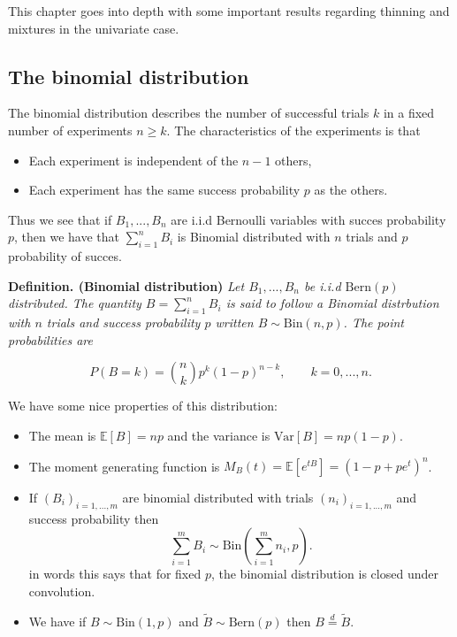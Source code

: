\documentclass[a4paper,10pt,openany]{book}
\providecommand{\tightlist}{%
 \setlength{\itemsep}{0pt}\setlength{\parskip}{0pt}}
\begin{document}
This chapter goes into depth with some important results regarding thinning and mixtures in the univariate case.

\hypertarget{the-binomial-distribution}{%
\subsection{The binomial distribution}\label{the-binomial-distribution}}

The binomial distribution describes the number of successful trials \(k\) in a fixed number of experiments \(n\ge k\). The characteristics of the experiments is that

\begin{itemize}
\tightlist
\item
  Each experiment is independent of the \(n-1\) others,
\item
  Each experiment has the same success probability \(p\) as the others.
\end{itemize}

Thus we see that if \(B_1,...,B_n\) are i.i.d Bernoulli variables with succes probability \(p\), then we have that \(\sum_{i=1}^n B_i\) is Binomial distributed with \(n\) trials and \(p\) probability of succes.

\textbf{Definition. (Binomial distribution)} \emph{Let \(B_1,...,B_n\) be i.i.d \(\text{Bern}(p)\) distributed. The quantity \(B=\sum_{i=1}^n B_i\) is said to follow a Binomial distrbution with \(n\) trials and success probability \(p\) written \(B\sim \text{Bin}(n,p)\). The point probabilities are}

\[
P(B=k)={n\choose k}p^k(1-p)^{n-k},\qquad k=0,...,n.
\]

We have some nice properties of this distribution:

\begin{itemize}
\tightlist
\item
  The mean is \(\mathbb E[B]=np\) and the variance is \(\text{Var}[B]=np(1-p)\).
\item
  The moment generating function is \(M_B(t)=\mathbb E[e^{tB}]=(1-p+pe^t)^n\).
\item
  If \((B_i)_{i=1,...,m}\) are binomial distributed with trials \((n_i)_{i=1,...,m}\) and success probability then
  \[\sum_{i=1}^m B_i\sim\text{Bin}\left(\sum_{i=1}^m n_i, p\right).\]
  in words this says that for fixed \(p\), the binomial distribution is closed under convolution.
\item
  We have if \(B\sim \text{Bin}(1,p)\) and \(\tilde B\sim \text{Bern}(p)\) then \(B\stackrel{d}{=}\tilde B\).
\end{itemize}
\end{document}

